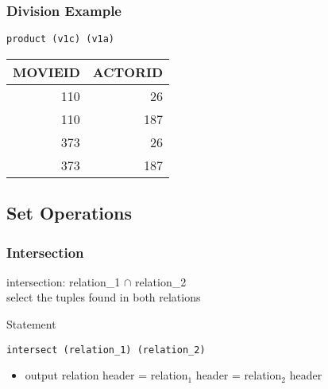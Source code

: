 \documentclass[dvipsnames]{beamer}
\theoremstyle{plain}
\begin{document}
\begin{frame}[fragile]
  \frametitle{Division Example}

  \begin{example}
    \begin{lstlisting}
product (v1c) (v1a)
    \end{lstlisting}

    \pause
    \begin{tiny}
    \begin{table}
      \begin{tabular}{|r|r|}\hline
MOVIEID &  ACTORID\\\hline\hline
    110 &       26\\\hline
    110 &      187\\\hline
    373 &       26\\\hline
    373 &      187\\\hline
      \end{tabular}
    \end{table}
    \end{tiny}
  \end{example}
\end{frame}

\subsection{Set Operations}

\begin{frame}[fragile]
  \frametitle{Intersection}

  \begin{definition}
    \alert{intersection}: relation\_1 $\cap$ relation\_2\\
      select the tuples found in both relations
  \end{definition}

  \pause
  \begin{block}{Statement}
    \begin{lstlisting}
intersect (relation_1) (relation_2)
    \end{lstlisting}
  \end{block}

  \pause
  \begin{itemize}
    \item output relation header = relation$_1$ header = relation$_2$ header
  \end{itemize}
\end{frame}
\end{document}
